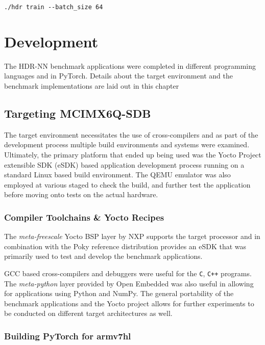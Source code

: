 \begin{verbatim}
./hdr train --batch_size 64
\end{verbatim}



\chapter{Development}

The HDR-NN benchmark applications were completed in different programming languages and in PyTorch. Details about the target environment and the benchmark implementations are laid out in this chapter

\section{Targeting MCIMX6Q-SDB}

The target environment necessitates the use of cross-compilers and as part of the development process multiple build environments and systems were examined. Ultimately, the primary platform that ended up being used was the Yocto Project extensible SDK (eSDK) based application development process running on a standard Linux based build environment. The QEMU emulator was also employed at various staged to check the build, and further test the application before moving onto tests on the actual hardware.

\subsection{Compiler Toolchains \& Yocto Recipes}

The \textit{meta-freescale} Yocto BSP layer by NXP supports the target processor and in combination with the Poky reference distribution provides an eSDK that was primarily used to test and develop the benchmark applications.

GCC based cross-compilers and debuggers were useful for the \texttt{C}, \texttt{C++}  programs. The \textit{meta-python} layer provided by Open Embedded was also useful in allowing for applications using Python and NumPy. The general portability of the benchmark applications and the Yocto project allows for further experiments to be conducted on different target architectures as well.

\subsection{Building PyTorch for armv7hl}

